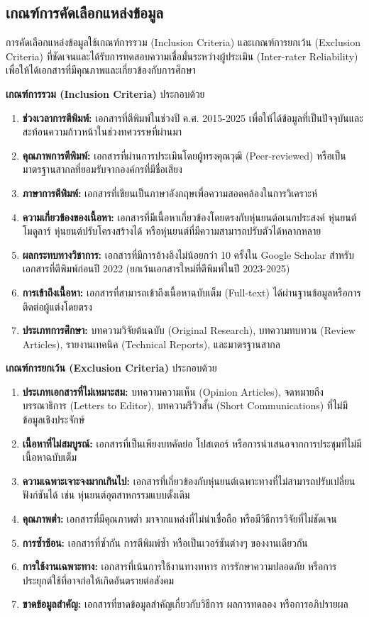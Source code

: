 \documentclass[a4paper]{article}
\begin{document}
\subsection{เกณฑ์การคัดเลือกแหล่งข้อมูล}

การคัดเลือกแหล่งข้อมูลใช้เกณฑ์การรวม (Inclusion Criteria) และเกณฑ์การยกเว้น (Exclusion Criteria) ที่ชัดเจนและได้รับการทดสอบความเชื่อมั่นระหว่างผู้ประเมิน (Inter-rater Reliability) เพื่อให้ได้เอกสารที่มีคุณภาพและเกี่ยวข้องกับการศึกษา

\textbf{เกณฑ์การรวม (Inclusion Criteria)} ประกอบด้วย
\begin{enumerate}
\item \textbf{ช่วงเวลาการตีพิมพ์:} เอกสารที่ตีพิมพ์ในช่วงปี ค.ศ. 2015-2025 เพื่อให้ได้ข้อมูลที่เป็นปัจจุบันและสะท้อนความก้าวหน้าในช่วงทศวรรษที่ผ่านมา
\item \textbf{คุณภาพการตีพิมพ์:} เอกสารที่ผ่านการประเมินโดยผู้ทรงคุณวุฒิ (Peer-reviewed) หรือเป็นมาตรฐานสากลที่ยอมรับจากองค์กรที่มีชื่อเสียง
\item \textbf{ภาษาการตีพิมพ์:} เอกสารที่เขียนเป็นภาษาอังกฤษเพื่อความสอดคล้องในการวิเคราะห์
\item \textbf{ความเกี่ยวข้องของเนื้อหา:} เอกสารที่มีเนื้อหาเกี่ยวข้องโดยตรงกับหุ่นยนต์อเนกประสงค์ หุ่นยนต์โมดูลาร์ หุ่นยนต์ปรับโครงสร้างได้ หรือหุ่นยนต์ที่มีความสามารถปรับตัวได้หลากหลาย
\item \textbf{ผลกระทบทางวิชาการ:} เอกสารที่มีการอ้างอิงไม่น้อยกว่า 10 ครั้งใน Google Scholar สำหรับเอกสารที่ตีพิมพ์ก่อนปี 2022 (ยกเว้นเอกสารใหม่ที่ตีพิมพ์ในปี 2023-2025)
\item \textbf{การเข้าถึงเนื้อหา:} เอกสารที่สามารถเข้าถึงเนื้อหาฉบับเต็ม (Full-text) ได้ผ่านฐานข้อมูลหรือการติดต่อผู้แต่งโดยตรง
\item \textbf{ประเภทการศึกษา:} บทความวิจัยต้นฉบับ (Original Research), บทความทบทวน (Review Articles), รายงานเทคนิค (Technical Reports), และมาตรฐานสากล
\end{enumerate}

\textbf{เกณฑ์การยกเว้น (Exclusion Criteria)} ประกอบด้วย
\begin{enumerate}
\item \textbf{ประเภทเอกสารที่ไม่เหมาะสม:} บทความความเห็น (Opinion Articles), จดหมายถึงบรรณาธิการ (Letters to Editor), บทความรีวิวสั้น (Short Communications) ที่ไม่มีข้อมูลเชิงประจักษ์
\item \textbf{เนื้อหาที่ไม่สมบูรณ์:} เอกสารที่เป็นเพียงบทคัดย่อ โปสเตอร์ หรือการนำเสนอจากการประชุมที่ไม่มีเนื้อหาฉบับเต็ม
\item \textbf{ความเฉพาะเจาะจงมากเกินไป:} เอกสารที่เกี่ยวข้องกับหุ่นยนต์เฉพาะทางที่ไม่สามารถปรับเปลี่ยนฟังก์ชันได้ เช่น หุ่นยนต์อุตสาหกรรมแบบดั้งเดิม
\item \textbf{คุณภาพต่ำ:} เอกสารที่มีคุณภาพต่ำ มาจากแหล่งที่ไม่น่าเชื่อถือ หรือมีวิธีการวิจัยที่ไม่ชัดเจน
\item \textbf{การซ้ำซ้อน:} เอกสารที่ซ้ำกัน การตีพิมพ์ซ้ำ หรือเป็นเวอร์ชันต่างๆ ของงานเดียวกัน
\item \textbf{การใช้งานเฉพาะทาง:} เอกสารที่เน้นการใช้งานทางทหาร การรักษาความปลอดภัย หรือการประยุกต์ใช้ที่อาจก่อให้เกิดอันตรายต่อสังคม
\item \textbf{ขาดข้อมูลสำคัญ:} เอกสารที่ขาดข้อมูลสำคัญเกี่ยวกับวิธีการ ผลการทดลอง หรือการอภิปรายผล
\end{enumerate}
\end{document}

